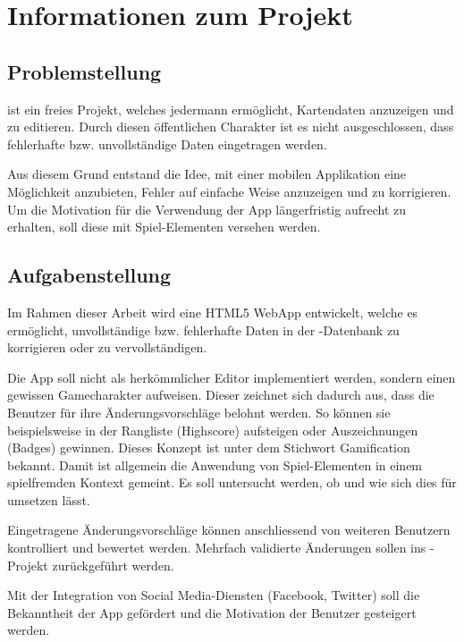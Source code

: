 \chapter{Informationen zum Projekt}
\label{informationen-projekt}


\section{Problemstellung}
 ist ein freies Projekt, welches jedermann ermöglicht, Kartendaten anzuzeigen und zu editieren.
Durch diesen öffentlichen Charakter ist es nicht ausgeschlossen, dass fehlerhafte bzw. unvollständige Daten eingetragen werden.

Aus diesem Grund entstand die Idee, mit einer mobilen Applikation eine Möglichkeit anzubieten, Fehler auf einfache Weise anzuzeigen und zu korrigieren.
Um die Motivation für die Verwendung der App längerfristig aufrecht zu erhalten, soll diese mit Spiel-Elementen versehen werden.

\section{Aufgabenstellung}
Im Rahmen dieser Arbeit wird eine HTML5 \gls{WebApp} entwickelt, welche es ermöglicht, unvollständige bzw. fehlerhafte Daten in der -Datenbank zu korrigieren oder zu vervollständigen.

Die App soll nicht als herkömmlicher Editor implementiert werden, sondern einen gewissen Gamecharakter aufweisen.
Dieser zeichnet sich dadurch aus, dass die Benutzer für ihre Änderungsvorschläge belohnt werden.
So können sie beispielsweise in der Rangliste (Highscore) aufsteigen oder Auszeichnungen (Badges) gewinnen.
Dieses Konzept ist unter dem Stichwort \gls{Gamification} bekannt.
Damit ist allgemein die Anwendung von Spiel-Elementen in einem spielfremden Kontext gemeint.
Es soll untersucht werden, ob und wie sich dies für  umsetzen lässt.

Eingetragene Änderungsvorschläge können anschliessend von weiteren Benutzern kontrolliert und bewertet werden.
Mehrfach validierte Änderungen sollen ins -Projekt zurückgeführt werden.

Mit der Integration von Social Media-Diensten (Facebook, Twitter) soll die Bekanntheit der App gefördert und die Motivation der Benutzer gesteigert werden.

